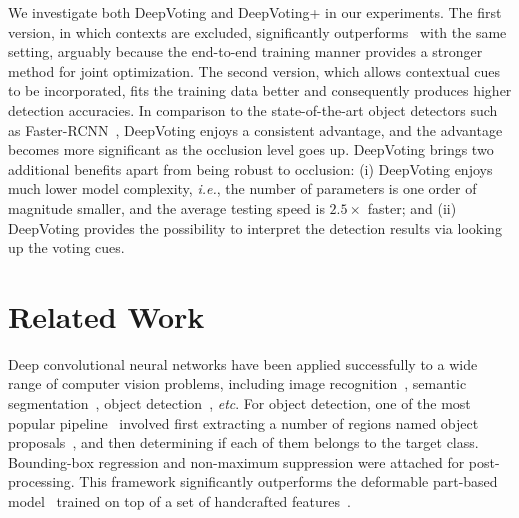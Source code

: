 \documentclass[10pt,twocolumn,letterpaper]{article}
\begin{document}
  We investigate both DeepVoting and DeepVoting+ in our experiments. The first version, in which contexts are excluded, significantly outperforms~\cite{wang2017detecting} with the same setting, arguably because the end-to-end training manner provides a stronger method for joint optimization. The second version, which allows contextual cues to be incorporated, fits the training data better and consequently produces higher detection accuracies. In comparison to the state-of-the-art object detectors such as Faster-RCNN~\cite{Ren_2015_Faster}, DeepVoting enjoys a consistent advantage, and the advantage becomes more significant as the occlusion level goes up. DeepVoting brings two additional benefits apart from being robust to occlusion: (i) DeepVoting enjoys much lower model complexity, {\em i.e.}, the number of parameters is one order of magnitude smaller, and the average testing speed is $2.5\times$ faster; and (ii) DeepVoting provides the possibility to interpret the detection results via looking up the voting cues.



  \section{Related Work}
  \label{RelatedWork}

  Deep convolutional neural networks have been applied successfully to a wide range of computer vision problems, including image recognition~\cite{Krizhevsky_2012_ImageNet,Simonyan_2015_Very,Szegedy_2015_Going,He_2016_Deep}, semantic segmentation~\cite{Long_2015_Fully,Chen_2016_DeepLab,Zheng_2015_Conditional}, object detection~\cite{Girshick_2015_Fast,Ren_2015_Faster,redmon2016you,liu2016ssd,zhang2017single}, {\em etc}. For object detection, one of the most popular pipeline~\cite{Girshick_2015_Fast,Ren_2015_Faster} involved first extracting a number of regions named object proposals~\cite{Alexe_2012_Measuring,Uijlings_2013_Selective,kuo2015deepbox,Ren_2015_Faster}, and then determining if each of them belongs to the target class. Bounding-box regression and non-maximum suppression were attached for post-processing. This framework significantly outperforms the deformable part-based model~\cite{Felzenszwalb_2010_Object} trained on top of a set of handcrafted features~\cite{Dalal_2005_Histograms}.
\end{document}
